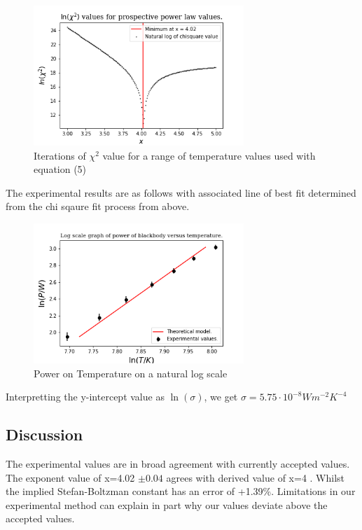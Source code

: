 \documentclass{article}%
\begin{document}
\begin{figure}[H]%
    \centering%
    \includegraphics[width=300px]{task4_fig_a.png}%
    \caption{Iterations of $\chi^2$ value for a range of temperature values used with equation (5)}%
    \end{figure}

The experimental results are as follows with associated line of best fit determined from the chi sqaure fit process from above.
\begin{figure}[H]%
  \centering%
  \includegraphics[width=300px]{task4_fig_b.png}%
  \caption{Power on Temperature on a natural log scale}%
  \end{figure}

  Interpretting the y-intercept value as $\ln(\sigma)$, we get $\sigma = 5.75 \cdot 10^{-8} Wm^{-2}K^{-4}$ 

%
\subsection{Discussion}%
\label{subsec:Discussion}%
The experimental values are in broad agreement with currently accepted values. The exponent value of x=4.02 $\pm 0.04$
agrees with derived value of x=4 \cite{Boltzman}. Whilst the implied Stefan-Boltzman constant has an error of +1.39\%. \cite{Martin}
Limitations in our experimental method can explain in part why our values deviate above the accepted values. \par
\end{document}
